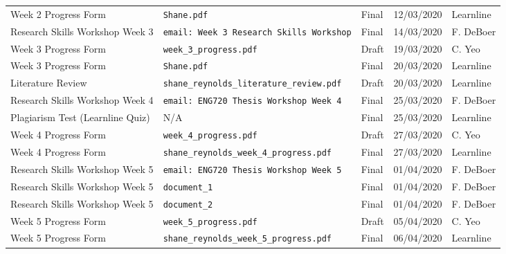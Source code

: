 \documentclass[10pt, landscape]{article}
\begin{document}
\begin{longtable}{p{7cm}p{10cm}p{1.5cm}p{2cm}p{2cm}}
	Week 2 Progress Form							& \verb|Shane.pdf|															& Final				& 12/03/2020			& Learnline\\
	
	Research Skills Workshop Week 3					& \verb|email: Week 3 Research Skills Workshop|								& Final				& 14/03/2020		 	& F. DeBoer\\
	
	Week 3 Progress Form							& \verb|week_3_progress.pdf|												& Draft				& 19/03/2020			& C. Yeo\\
		
	Week 3 Progress Form							& \verb|Shane.pdf|															& Final				& 20/03/2020			& Learnline\\
	
	Literature Review 								& \verb|shane_reynolds_literature_review.pdf|								& Draft 			& 20/03/2020		 	& Learnline\\
	
	Research Skills Workshop Week 4					& \verb|email: ENG720 Thesis Workshop Week 4|								& Final				& 25/03/2020		 	& F. DeBoer\\
	
	Plagiarism Test (Learnline Quiz)				& N/A																		& Final 			& 25/03/2020		 	& Learnline\\
	
	Week 4 Progress Form							& \verb|week_4_progress.pdf|												& Draft				& 27/03/2020			& C. Yeo\\
			
	Week 4 Progress Form							& \verb|shane_reynolds_week_4_progress.pdf|												& Final				& 27/03/2020			& Learnline\\
	
	Research Skills Workshop Week 5					& \verb|email: ENG720 Thesis Workshop Week 5|								& Final				& 01/04/2020		 	& F. DeBoer\\
	
	Research Skills Workshop Week 5					& \verb|document_1|															& Final				& 01/04/2020		 	& F. DeBoer\\
	
	Research Skills Workshop Week 5					& \verb|document_2|															& Final				& 01/04/2020		 	& F. DeBoer\\
	
	Week 5 Progress Form							& \verb|week_5_progress.pdf|												& Draft				& 05/04/2020			& C. Yeo\\
	
	Week 5 Progress Form							& \verb|shane_reynolds_week_5_progress.pdf|									& Final				& 06/04/2020			& Learnline\\
	

\end{longtable}
\end{document}
